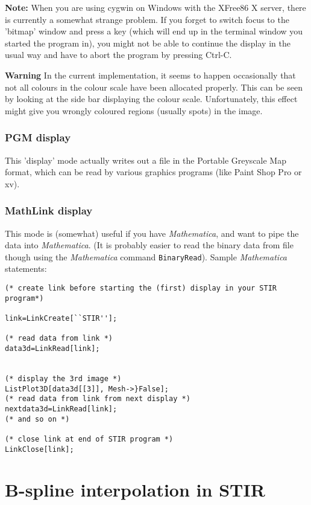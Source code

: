 \documentclass{article}
\begin{document}
\textbf{Note:} When you are using cygwin on Windows with the XFree86 
X server, there is currently a somewhat strange problem. If you 
forget to switch focus to the 'bitmap' window and press a key 
(which will end up in the terminal window you started the program 
in), you might not be able to continue the display in the usual 
way and have to abort the program by pressing Ctrl-C. 


\textbf{Warning} In the current implementation, it seems to happen 
occasionally that not all colours in the colour scale have been 
allocated properly. This can be seen by looking at the side bar 
displaying the colour scale. Unfortunately, this effect might 
give you wrongly coloured regions (usually spots) in the image.


\subsubsection{
PGM display}

This 'display' mode actually writes out a file in the Portable 
Greyscale Map format, which can be read by various graphics programs 
(like Paint Shop Pro or xv).


\subsubsection{
MathLink display}

This mode is (somewhat) useful if you have \textit{Mathematica\texttrademark}, 
and want to pipe the data into \textit{Mathematica}. (It is probably 
easier to read the binary data from file though using the \textit{Mathematica} command \texttt{BinaryRead}). 
Sample \textit{Mathematica} statements:

\begin{verbatim}
(* create link before starting the (first) display in your STIR 
program*)

link=LinkCreate[``STIR''];

(* read data from link *)
data3d=LinkRead[link];


(* display the 3rd image *)
ListPlot3D[data3d[[3]], Mesh->}False];
(* read data from link from next display *)
nextdata3d=LinkRead[link];
(* and so on *)

(* close link at end of STIR program *)
LinkClose[link];
\end{verbatim}


\section{B-spline interpolation in STIR}
\end{document}
